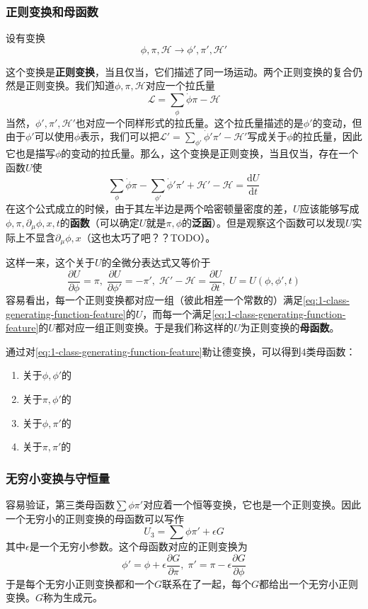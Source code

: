 \documentclass[UTF8, a4paper]{ctexart}
\begin{document}
\subsubsection{正则变换和母函数}
设有变换
\begin{equation}
    \phi, \pi, \mathcal{H} \longrightarrow \phi', \pi', \mathcal{H}'
    \label{eq:canonical-transformation}
\end{equation}

这个变换是\textbf{正则变换}，当且仅当，它们描述了同一场运动。两个正则变换的复合仍然是正则变换。我们知道$\phi, \pi, \mathcal{H}$对应一个拉氏量
\[
    \mathcal{L} = \sum_\phi \dot{\phi} \pi - \mathcal{H}
\]
当然，$\phi', \pi', \mathcal{H}'$也对应一个同样形式的拉氏量。这个拉氏量描述的是$\phi'$的变动，但由于$\phi'$可以使用$\phi$表示，我们可以把$\mathcal{L}' = \sum_{\phi'} \dot{\phi}' \pi' - \mathcal{H}'$写成关于$\phi$的拉氏量，因此它也是描写$\phi$的变动的拉氏量。那么，这个变换是正则变换，当且仅当，存在一个函数$U$使
\[
    \sum_\phi \dot{\phi} \pi - \sum_{\phi'} \dot{\phi}' \pi' + \mathcal{H}' - \mathcal{H} = \frac{\mathrm{d}U}{\mathrm{d}t}
\]
在这个公式成立的时候，由于其左半边是两个哈密顿量密度的差，$U$应该能够写成$\phi, \pi,  \partial_\mu \phi, x, t$的\textbf{函数}（可以确定$U$就是$\pi, \phi$的\textbf{泛函}）。但是观察这个函数可以发现$U$实际上不显含$\partial_\mu \phi, x$（这也太巧了吧？？TODO）。

这样一来，这个关于$U$的全微分表达式又等价于
\begin{equation}
    \frac{\partial U}{\partial \phi} = \pi, \; \frac{\partial U}{\partial \phi'} = -\pi', \; \mathcal{H}' - \mathcal{H} = \frac{\partial U}{\partial t}, \; U=U(\phi, \phi', t)
    \label{eq:1-class-generating-function-feature}
\end{equation}
容易看出，每一个正则变换都对应一组（彼此相差一个常数的）满足\eqref{eq:1-class-generating-function-feature}的$U$，而每一个满足\eqref{eq:1-class-generating-function-feature}的$U$都对应一组正则变换。于是我们称这样的$U$为正则变换的\textbf{母函数}。

通过对\eqref{eq:1-class-generating-function-feature}勒让德变换，可以得到4类母函数：
\begin{enumerate}
    \item 关于$\phi, \phi'$的
    \item 关于$\pi, \phi'$的
    \item 关于$\phi, \pi'$的
    \item 关于$\pi, \pi'$的
\end{enumerate}

\subsubsection{无穷小变换与守恒量}
容易验证，第三类母函数$\sum \phi \pi'$对应着一个恒等变换，它也是一个正则变换。因此一个无穷小的正则变换的母函数可以写作
\[
    U_3 = \sum \phi \pi' + \epsilon G
\]
其中$\epsilon$是一个无穷小参数。这个母函数对应的正则变换为
\begin{equation}
    \phi' = \phi + \epsilon \frac{\partial G}{\partial \pi}, \; \pi' = \pi - \epsilon \frac{\partial G}{\partial \phi}
\end{equation}
于是每个无穷小正则变换都和一个$G$联系在了一起，每个$G$都给出一个无穷小正则变换。$G$称为生成元。
\end{document}
